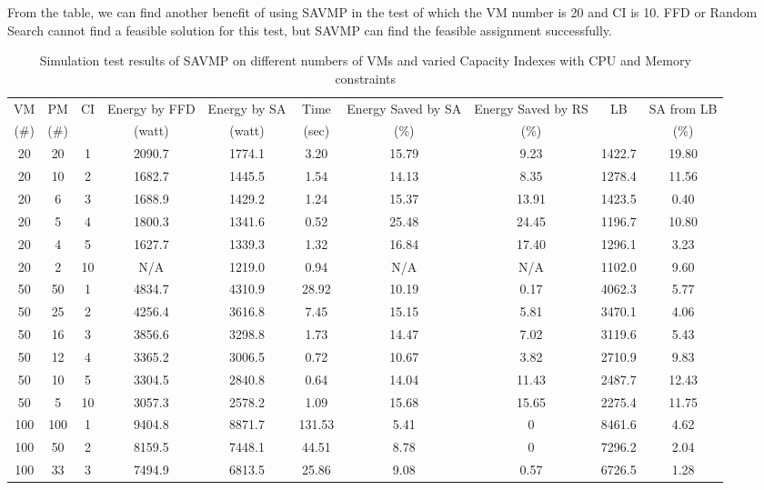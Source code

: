 \documentclass[10pt, conference, compsocconf]{IEEEtran}
\begin{document}
From the table, we can find another benefit of using SAVMP in the test of which
the VM number is 20 and CI is 10. FFD or Random Search cannot find a feasible
solution for this test, but SAVMP can find the feasible assignment successfully.


\begin{table*}[t]
\begin{center}
\begin{threeparttable}

\caption{Simulation test results of SAVMP on different numbers of VMs and varied
Capacity Indexes with CPU and Memory constraints}
\begin{tabular}{c|c|c|c|c|c|c|c|c|c}
\hline\hline
 VM & PM & CI & Energy by FFD&Energy by SA&Time&Energy
 Saved by SA&Energy Saved by RS& LB & SA from LB\\
 (\#) & (\#) &  & (watt) & (watt)& (sec) & (\%) & (\%) &  &(\%) \\
\hline
20 &20 & 1 & 2090.7 & 1774.1 & 3.20 & 15.79 & 9.23 & 1422.7 & 19.80\\
20 &10 & 2 & 1682.7 & 1445.5 & 1.54 & 14.13 & 8.35 & 1278.4 & 11.56\\
20 &6 & 3 & 1688.9 & 1429.2 & 1.24 & 15.37 & 13.91 & 1423.5 & 0.40\\
20 &5 & 4 & 1800.3 & 1341.6 & 0.52 & 25.48 & 24.45 & 1196.7 & 10.80\\
20 &4 & 5 & 1627.7 & 1339.3 & 1.32 & 16.84 & 17.40 & 1296.1 & 3.23\\
20 &2 & 10 & N/A\tnote{a} & 1219.0 & 0.94 & N/A\tnote{a} & N/A\tnote{a} &
1102.0 & 9.60\\
\hline
50 &50 & 1 & 4834.7 & 4310.9 & 28.92 & 10.19 & 0.17 & 4062.3 & 5.77\\
50 &25 & 2 & 4256.4 & 3616.8 & 7.45 & 15.15 & 5.81 & 3470.1 & 4.06\\
50 &16 & 3 & 3856.6 & 3298.8 & 1.73 & 14.47 & 7.02 & 3119.6 & 5.43\\
50 &12 & 4 & 3365.2 & 3006.5 & 0.72 & 10.67 & 3.82 & 2710.9 & 9.83\\
50 &10 & 5 & 3304.5 & 2840.8 & 0.64 & 14.04 & 11.43 & 2487.7 & 12.43\\
50 &5 & 10 & 3057.3 & 2578.2 & 1.09 & 15.68 & 15.65 & 2275.4 & 11.75\\
\hline
100 &100 & 1 & 9404.8 & 8871.7 & 131.53 & 5.41 & 0 & 8461.6 & 4.62\\
100 &50 & 2 & 8159.5 & 7448.1 & 44.51 & 8.78 & 0 & 7296.2 & 2.04\\
100 &33 & 3 & 7494.9 & 6813.5 & 25.86 & 9.08 & 0.57 & 6726.5 & 1.28\\

\end{tabular}
\end{threeparttable}
\end{center}
\end{table*}
\end{document}
